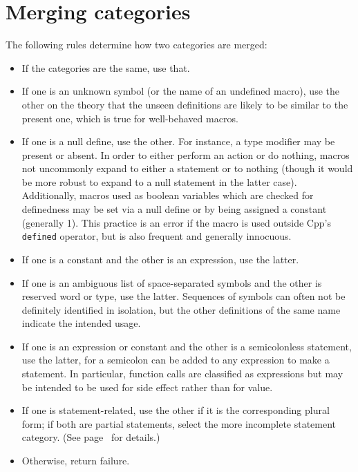 \documentclass[10pt]{article}
\begin{document}


{\small }


\appendix

\section{Merging categories}
\label{app:category-lub}

The following rules determine how two categories are merged:
\begin{itemize}\itemsep 0pt \parskip 0pt

\item If the categories are the same, use that.

\item If one is an unknown symbol (or the name of an undefined macro), use
  the other on the theory that the unseen definitions are likely to be
  similar to the present one, which is true for well-behaved macros.

\item If one is a null define, use the other.  For instance, a type
  modifier may be present or absent.  In order to either perform an action
  or do nothing, macros not uncommonly expand to either a statement or to
  nothing (though it would be more robust to expand to a null statement in
  the latter case).  Additionally, macros used as boolean variables which
  are checked for definedness may be set via a null define or by being
  assigned a constant (generally 1).  This practice is an error if the
  macro is used outside Cpp's {\tt defined} operator, but is also frequent
  and generally innocuous.

\item If one is a constant and the other is an expression, use the latter.

\item If one is an ambiguous list of space-separated symbols and the other
  is reserved word or type, use the latter.  Sequences of symbols can often
  not be definitely identified in isolation, but the other definitions of
  the same name indicate the intended usage.

\item If one is an expression or constant and the other is a semicolonless
  statement, use the latter, for a semicolon can be added to any expression
  to make a statement.  In particular, function calls are classified as
  expressions but may be intended to be used for side effect rather than
  for value.

\item If one is statement-related, use the other if it is the corresponding
  plural form; if both are partial statements, select the more incomplete
  statement category.  (See page~\pageref{item:statement-category} for
  details.)

\item Otherwise, return failure.
\end{itemize}
\end{document}
